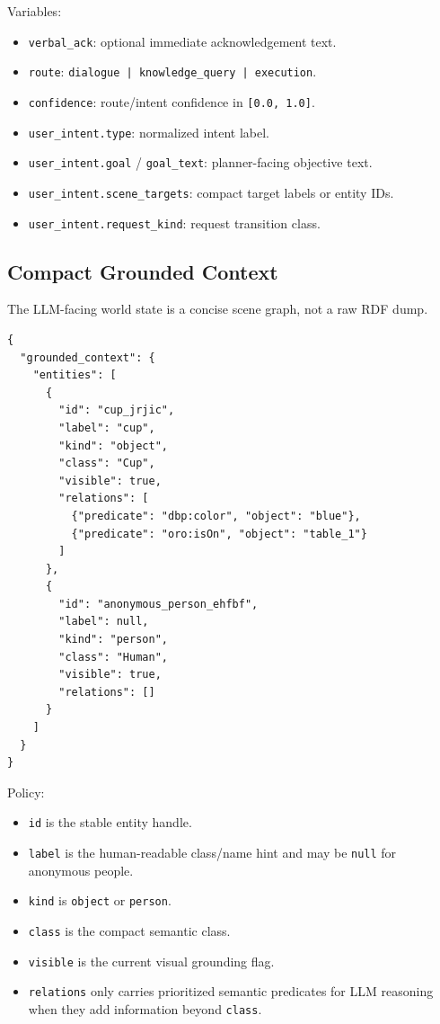 \documentclass[12pt,a4paper]{article}
\newcommand{\code}[1]{\texttt{#1}}
\begin{document}
Variables:

\begin{itemize}
\item \code{verbal\_ack}: optional immediate acknowledgement text.
\item \code{route}: \code{dialogue | knowledge\_query | execution}.
\item \code{confidence}: route/intent confidence in \code{[0.0, 1.0]}.
\item \code{user\_intent.type}: normalized intent label.
\item \code{user\_intent.goal} / \code{goal\_text}: planner-facing objective text.
\item \code{user\_intent.scene\_targets}: compact target labels or entity IDs.
\item \code{user\_intent.request\_kind}: request transition class.
\end{itemize}



\subsection{Compact Grounded Context}

The LLM-facing world state is a concise scene graph, not a raw RDF dump.

\begin{lstlisting}
{
  "grounded_context": {
    "entities": [
      {
        "id": "cup_jrjic",
        "label": "cup",
        "kind": "object",
        "class": "Cup",
        "visible": true,
        "relations": [
          {"predicate": "dbp:color", "object": "blue"},
          {"predicate": "oro:isOn", "object": "table_1"}
        ]
      },
      {
        "id": "anonymous_person_ehfbf",
        "label": null,
        "kind": "person",
        "class": "Human",
        "visible": true,
        "relations": []
      }
    ]
  }
}
\end{lstlisting}

Policy:

\begin{itemize}
\item \code{id} is the stable entity handle.
\item \code{label} is the human-readable class/name hint and may be \code{null} for anonymous people.
\item \code{kind} is \code{object} or \code{person}.
\item \code{class} is the compact semantic class.
\item \code{visible} is the current visual grounding flag.
\item \code{relations} only carries prioritized semantic predicates for LLM reasoning when they add information beyond \code{class}.
\end{itemize}
\end{document}
